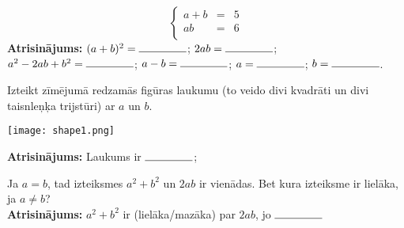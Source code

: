 \documentclass[11pt]{article}
\begin{document}
\begin{problem}
\[
\left\{
\begin{array}{lcl}
a + b & = & 5 \\
ab & = & 6 \\
\end{array}
\right.
\]
{\bf Atrisinājums:} $(a + b)^2 = \rule{10ex}{.4pt}$; $2ab = \rule{10ex}{.4pt}$; \\[5mm]
$a^2 - 2ab + b^2 = \rule{10ex}{.4pt}$; $a - b = \rule{10ex}{.4pt}$; $a = \rule{10ex}{.4pt}$;
$b = \rule{10ex}{.4pt}$.
\end{problem}

\begin{problem}
Izteikt zīmējumā redzamās figūras laukumu (to veido divi kvadrāti un divi taisnleņķa trijstūri) ar $a$ un $b$.
\begin{center}
\texttt{[image: shape1.png]}
\end{center}
{\bf Atrisinājums:} Laukums ir $\rule{10ex}{.4pt}$;
\end{problem}

\begin{problem}
Ja $a = b$, tad izteiksmes $a^2 + b^2$ un $2ab$ ir vienādas. Bet kura izteiksme ir lielāka, ja $a \neq b$?  \\[5mm]
{\bf Atrisinājums:}  $a^2 + b^2$ ir (lielāka/mazāka) par $2ab$, jo $\rule{10ex}{.4pt}$
\end{problem}
 
\end{document}
